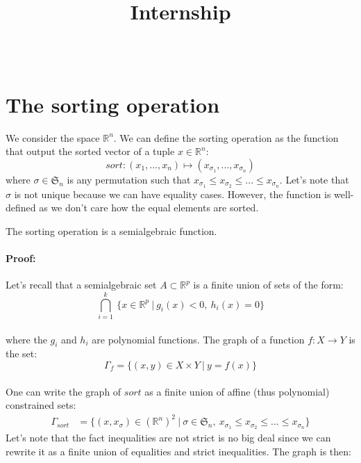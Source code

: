 \documentclass[twoside,11pt]{article}
\begin{document}
    
    \title{Internship \assignmentNumber}
    
    \author{\name \studentName \email \studentEmail \\
    \studentNumber
    \addr
    }
    
    \maketitle


\section{The sorting operation}

We consider the space $\mathbb{R}^n$. We can define the sorting operation as the function that output the sorted vector of a tuple $x \in \mathbb{R}^n$:
\begin{equation}
    sort : (x_1, ..., x_n) \longmapsto (x_{\sigma_1}, ..., x_{\sigma_n}) 
\end{equation}
where $\sigma \in \mathfrak{S}_n$ is any permutation such that $x_{\sigma_1} \leq  x_{\sigma_2} \leq ... \leq x_{\sigma_n}$. Let's note that $\sigma$ is not unique because we can have equality cases. However, the function is well-defined as we don't care how the equal elements are sorted.
\begin{proposition}
The sorting operation is a semialgebraic function. 
\end{proposition}

\paragraph{Proof:} 
Let's recall that a semialgebraic set $A \subset \mathbb{R}^p$ is a finite union of sets of the form:
\begin{equation}
    \bigcap_{i=1}^k\: \{x \in \mathbb{R}^p \ | \ g_i(x) < 0, \ h_i(x) = 0 \}
\end{equation}\\
where the $g_i$ and $h_i$ are polynomial functions. The graph of a function $f : X \longrightarrow Y$ is the set:
\begin{equation}
    \Gamma_f = \{(x, y) \in X \times Y \ | \ y = f(x)  \}
\end{equation}
\\
One can write the graph of $sort$ as a finite union of affine (thus polynomial) constrained sets:
\begin{align*}
    \Gamma_{sort} &= \{(x, x_{\sigma}) \in (\mathbb{R}^n)^2 \ | \ \sigma \in \mathfrak{S}_n,\ x_{\sigma_1} \leq  x_{\sigma_2} \leq ... \leq x_{\sigma_n} \}
\end{align*}
Let's note that the fact inequalities are not strict is no big deal since we can rewrite it as a finite union of equalities and strict inequalities. The graph is then:
\end{document}
